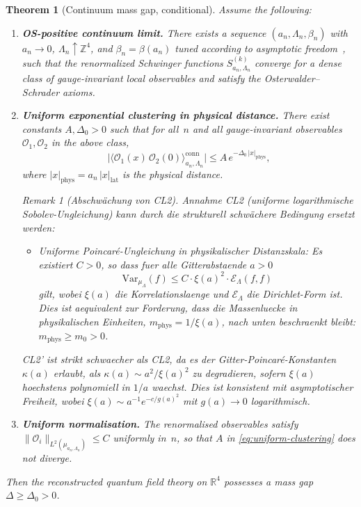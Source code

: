 \documentclass[12pt,a4paper]{article}
\theoremstyle{definition}
\theoremstyle{plain}
\newtheorem{theorem}[definition]{Theorem}
\theoremstyle{remark}
\newtheorem{remark}[definition]{Remark}
\begin{document}
\begin{theorem}[Continuum mass gap, conditional]
\label{thm:continuum-gap}
Assume the following:
\begin{enumerate}
    \item[\textup{(CL1)}] \textbf{OS-positive continuum limit.}  There exists a sequence $(a_n, \Lambda_n, \beta_n)$ with $a_n \to 0$, $\Lambda_n \uparrow \mathbb{Z}^4$, and $\beta_n = \beta(a_n)$ tuned according to asymptotic freedom~\cite{GrossWilczek1973,Politzer1973}, such that the renormalized Schwinger functions $S^{(k)}_{a_n,\Lambda_n}$ converge for a dense class of gauge-invariant local observables and satisfy the Osterwalder--Schrader axioms.
    \item[\textup{(CL2)}] \textbf{Uniform exponential clustering in physical distance.}  There exist constants $A, \Delta_0 > 0$ such that for all~$n$ and all gauge-invariant observables $\mathcal{O}_1, \mathcal{O}_2$ in the above class,
    \begin{equation}\label{eq:uniform-clustering}
        \bigl|\langle \mathcal{O}_1(x)\,\mathcal{O}_2(0)\rangle_{a_n,\Lambda_n}^{\mathrm{conn}}\bigr|
        \leq A\,e^{-\Delta_0\,|x|_{\mathrm{phys}}},
    \end{equation}
    where $|x|_{\mathrm{phys}} = a_n\,|x|_{\mathrm{lat}}$ is the physical distance.

\begin{remark}[Abschwächung von CL2]
\label{rem:cl2-relaxation}
Annahme CL2 (uniforme logarithmische Sobolev-Ungleichung) kann durch die strukturell schwächere Bedingung ersetzt werden:
\begin{itemize}
\item[\textbf{CL2'.}] \emph{Uniforme Poincar\'e-Ungleichung in physikalischer Distanzskala:} Es existiert $C > 0$, so dass fuer alle Gitterabstaende $a > 0$
\[
\mathrm{Var}_{\mu_\Lambda}(f) \leq C \cdot \xi(a)^2 \cdot \mathcal{E}_\Lambda(f, f)
\]
gilt, wobei $\xi(a)$ die Korrelationslaenge und $\mathcal{E}_\Lambda$ die Dirichlet-Form ist. Dies ist aequivalent zur Forderung, dass die Massenluecke in physikalischen Einheiten, $m_{\mathrm{phys}} = 1/\xi(a)$, nach unten beschraenkt bleibt: $m_{\mathrm{phys}} \geq m_0 > 0$.
\end{itemize}
CL2' ist strikt schwaecher als CL2, da es der Gitter-Poincar\'e-Konstanten $\kappa(a)$ erlaubt, als $\kappa(a) \sim a^2/\xi(a)^2$ zu degradieren, sofern $\xi(a)$ hoechstens polynomiell in $1/a$ waechst. Dies ist konsistent mit asymptotischer Freiheit, wobei $\xi(a) \sim a^{-1} e^{-c/g(a)^2}$ mit $g(a) \to 0$ logarithmisch.
\end{remark}

    \item[\textup{(CL3)}] \textbf{Uniform normalisation.}  The renormalised observables satisfy $\|\mathcal{O}_i\|_{L^2(\mu_{a_n,\Lambda_n})} \leq C$ uniformly in~$n$, so that $A$ in \eqref{eq:uniform-clustering} does not diverge.
\end{enumerate}
Then the reconstructed quantum field theory on $\mathbb{R}^4$ possesses a mass gap $\Delta \geq \Delta_0 > 0$.
\end{theorem}
\end{document}
